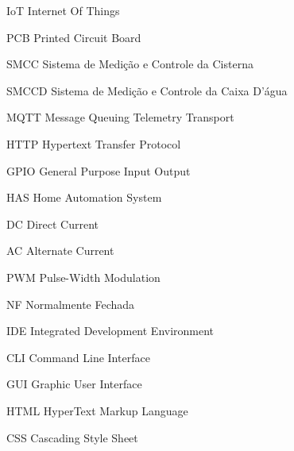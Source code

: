 
\begin{siglas}
    \item[IoT] Internet Of Things
    \item[PCB] Printed Circuit Board
    \item[SMCC] Sistema de Medição e Controle da Cisterna
    \item[SMCCD] Sistema de Medição e Controle da Caixa D'água
    \item[MQTT]  Message Queuing Telemetry Transport
    \item[HTTP] Hypertext Transfer Protocol
    \item[GPIO] General Purpose Input Output
    \item[HAS] Home Automation System
    \item[DC] Direct Current
    \item[AC] Alternate Current
    \item[PWM] Pulse-Width Modulation
    \item[NF] Normalmente Fechada
    \item[IDE]  Integrated Development Environment
    \item[CLI] Command Line Interface
    \item[GUI] Graphic User Interface
    \item [HTML] HyperText Markup Language
    \item[CSS] Cascading Style Sheet
\end{siglas}

